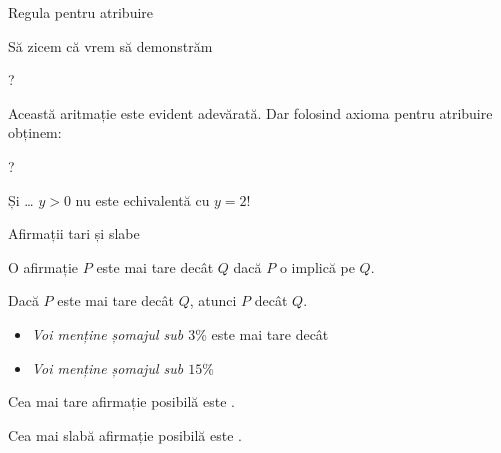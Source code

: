 \begin{frame}{Regula pentru atribuire}

\begin{example}
Să zicem că vrem să demonstrăm
\vspace{-.2cm}
\begin{center}
?
\end{center}
\vspace{-.2cm}  \pause
Această aritmație este evident adevărată. Dar folosind axioma pentru atribuire obținem:
\vspace{-.2cm}
\begin{center}
?
\end{center}
\vspace{-.2cm}
Și \ldots {\color{red} $y>0$ nu este echivalentă cu $y=2$!}
\end{example}
\end{frame}

\begin{frame}{Afirmații tari și slabe}

O afirmație $P$ este \alert{mai tare} decât $Q$ dacă \alert{$P$ o implică pe $Q$}.

Dacă $P$ este mai tare decât $Q$, atunci $P$  decât $Q$.

\pause
\begin{example}
\begin{itemize}
	\item {\em Voi menține șomajul sub $3\%$} este \alert{mai tare} decât
	\item {\em Voi menține șomajul sub $15\%$}
\end{itemize}
\end{example}

\pause
\alert{Cea mai tare} afirmație posibilă este \intens{$\bot$}.


\alert{Cea mai slabă} afirmație posibilă este \intens{$\top$}.

\end{frame}


